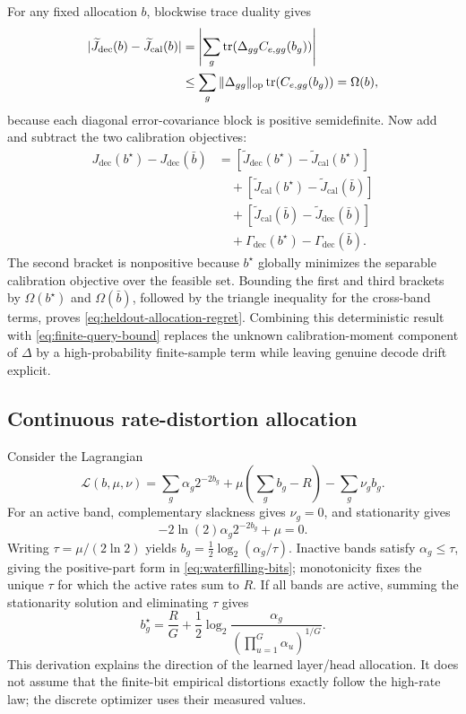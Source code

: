 For any fixed allocation $b$, blockwise trace duality gives
\begin{align}
 |\widetilde J_{\mathrm{dec}}(b)
   -\widetilde J_{\mathrm{cal}}(b)|
 &=
 \left|\sum_g\operatorname{tr}(\Delta_{gg}C_{e,gg}(b_g))\right|\\
 &\le
 \sum_g\|\Delta_{gg}\|_{\mathrm{op}}\operatorname{tr}(C_{e,gg}(b_g))
 =\Omega(b),
\end{align}
because each diagonal error-covariance block is positive semidefinite.
Now add and subtract the two calibration objectives:
\begin{align}
 J_{\mathrm{dec}}(b^\star)-J_{\mathrm{dec}}(\bar b)
 &=
 [\widetilde J_{\mathrm{dec}}(b^\star)
  -\widetilde J_{\mathrm{cal}}(b^\star)]\\
 &\quad+
 [\widetilde J_{\mathrm{cal}}(b^\star)
  -\widetilde J_{\mathrm{cal}}(\bar b)]\\
 &\quad+
 [\widetilde J_{\mathrm{cal}}(\bar b)
  -\widetilde J_{\mathrm{dec}}(\bar b)]\\
 &\quad+\Gamma_{\mathrm{dec}}(b^\star)
       -\Gamma_{\mathrm{dec}}(\bar b).
\end{align}
The second bracket is nonpositive because $b^\star$ globally minimizes the
separable calibration objective over the feasible set.  Bounding the first
and third brackets by $\Omega(b^\star)$ and $\Omega(\bar b)$, followed by
the triangle inequality for the cross-band terms, proves
\cref{eq:heldout-allocation-regret}.  Combining this deterministic result
with \cref{eq:finite-query-bound} replaces the unknown calibration-moment
component of $\Delta$ by a high-probability finite-sample term while leaving
genuine decode drift explicit.

\subsection{Continuous rate-distortion allocation}

Consider the Lagrangian
\begin{equation}
 \mathcal L(b,\mu,\nu)=
 \sum_g\alpha_g2^{-2b_g}
 +\mu\left(\sum_gb_g-R\right)-\sum_g\nu_gb_g .
\end{equation}
For an active band, complementary slackness gives $\nu_g=0$, and stationarity
gives
\begin{equation}
 -2\ln(2)\alpha_g2^{-2b_g}+\mu=0.
\end{equation}
Writing $\tau=\mu/(2\ln 2)$ yields
$b_g=\frac12\log_2(\alpha_g/\tau)$.
Inactive bands satisfy $\alpha_g\le\tau$, giving the positive-part form in
\cref{eq:waterfilling-bits}; monotonicity fixes the unique $\tau$ for which
the active rates sum to $R$.  If all bands are active, summing the
stationarity solution and eliminating $\tau$ gives
\begin{equation}
 b_g^\star=\frac RG+
 \frac12\log_2\frac{\alpha_g}
 {(\prod_{u=1}^{G}\alpha_u)^{1/G}}.
\end{equation}
This derivation explains the direction of the learned layer/head allocation.
It does not assume that the finite-bit empirical distortions exactly follow
the high-rate law; the discrete optimizer uses their measured values.

